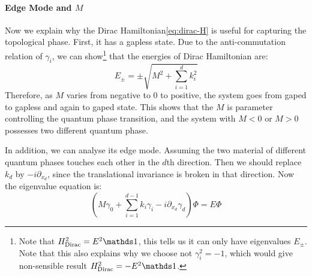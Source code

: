 \paragraph{Edge Mode and \texorpdfstring{$M$}{}}
Now we explain why the Dirac Hamiltonian\ref{eq:dirac-H}  is useful for capturing the topological
phase. First, it has a gapless state. Due to the anti-commutation relation of
$\gamma_i$, we can show\footnote{Note that $H_\text{Dirac}^2= E^2\id$, this
tells us it can only have eigenvalues $E_\pm$. Note that this also explains why
we choose not $\gamma_i^2=-1$, which would give non-sensible result
$H_\text{Dirac}^2= -E^2\id$.}
that the energies of Dirac Hamiltonian are:
\begin{equation}
    E_\pm = \pm\sqrt{M^2+\sum_{i=1}^d k^2_i}
\end{equation}
Therefore, as $M$ varies from negative to $0$ to positive, the system goes from
gaped to gapless and again to gaped state. This shows that the $M$ is parameter
controlling the quantum phase transition, and the system with $M<0$ or $M>0$
possesses two different quantum phase.

In addition, we can analyse its edge mode. Assuming the two material of
different quantum phases touches each other in the $d$th direction. Then we
should replace $k_d$ by $-i\partial_{x_d}$, since the translational invariance is
broken in that direction. Now the eigenvalue equation is:
\begin{equation}
    ( M\gamma_0 + \sum_{i=1}^{d-1} k_i\gamma_i - i\partial_{x_d}\gamma_d ) \Phi
    = E \Phi
\end{equation}

